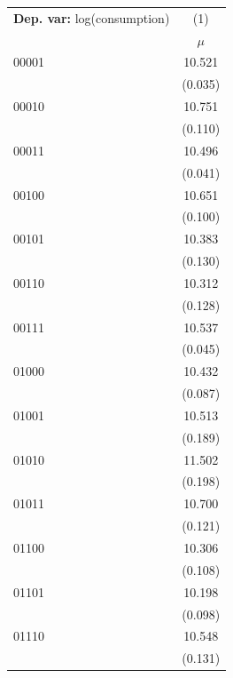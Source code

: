 \begin{tabular}{l c} \toprule  \textbf{Dep. var:}  log(consumption) 
                    &\multicolumn{1}{c}{(1)}         \\
                    &       $\mu$         \\
00001               &      10.521\sym{***}\\
                    &     (0.035)         \\
00010               &      10.751\sym{***}\\
                    &     (0.110)         \\
00011               &      10.496\sym{***}\\
                    &     (0.041)         \\
00100               &      10.651\sym{***}\\
                    &     (0.100)         \\
00101               &      10.383\sym{***}\\
                    &     (0.130)         \\
00110               &      10.312\sym{***}\\
                    &     (0.128)         \\
00111               &      10.537\sym{***}\\
                    &     (0.045)         \\
01000               &      10.432\sym{***}\\
                    &     (0.087)         \\
01001               &      10.513\sym{***}\\
                    &     (0.189)         \\
01010               &      11.502\sym{***}\\
                    &     (0.198)         \\
01011               &      10.700\sym{***}\\
                    &     (0.121)         \\
01100               &      10.306\sym{***}\\
                    &     (0.108)         \\
01101               &      10.198\sym{***}\\
                    &     (0.098)         \\
01110               &      10.548\sym{***}\\
                    &     (0.131)         \\

\end{tabular}
